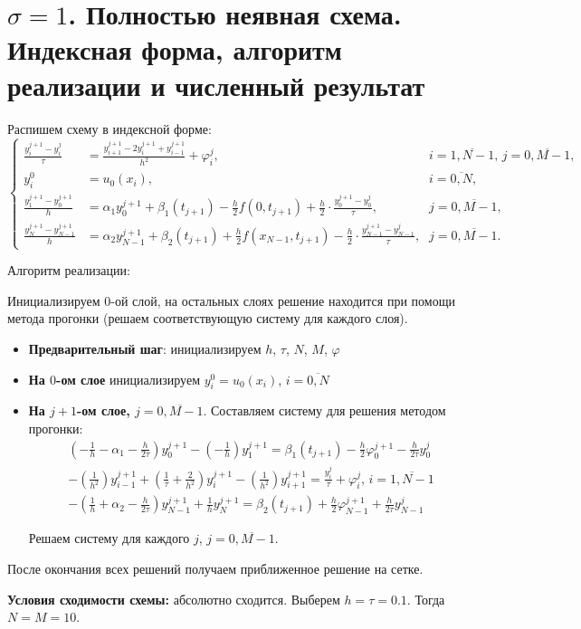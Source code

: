 \section{$\sigma=1$. Полностью неявная схема. Индексная форма, алгоритм реализации и численный результат}
Распишем схему в индексной форме:
\begin{equation}
\left\{
\begin{array}{lll}
\frac{y_{i}^{j+1}-y_{i}^{j}}{\tau} & =\frac{y_{i+1}^{j+1}-2y_{i}^{j+1}+y_{i-1}^{j+1}}{h^{2}} + \varphi_{i}^{j}\text{,} & i=\overline{1,N-1}\text{, } j=\overline{0,M-1}\text{,}\\
y_{i}^{0} & = u_{0}(x_{i})\text{,} & i=\overline{0,N}\text{,} \\
\frac{y_{1}^{j+1}-y_{0}^{j+1}}{h} & = \alpha_{1}y_{0}^{j+1} + \beta_{1}(t_{j+1}) - \frac{h}{2}f(0,t_{j+1}) + \frac{h}{2}\cdot\frac{y_{0}^{j+1}-y_{0}^{j}}{\tau}\text{,} & j=\overline{0,M-1}\text{,}\\
\frac{y_{N}^{j+1}-y_{N-1}^{j+1}}{h} & = \alpha_{2}y_{N-1}^{j+1} + \beta_{2}(t_{j+1}) + \frac{h}{2}f(x_{N-1},t_{j+1}) - \frac{h}{2}\cdot\frac{y_{N-1}^{j+1}-y_{N-1}^{j}}{\tau}\text{,} & j=\overline{0,M-1}\text{.}
\end{array}
\right.
\end{equation} \par

Алгоритм реализации:\par
Инициализируем $0$-ой слой, на остальных слоях решение находится при помощи метода прогонки (решаем соответствующую систему для каждого слоя).
\begin{itemize}
\item \textbf{Предварительный шаг}: инициализируем $h$, $\tau$, $N$, $M$, $\varphi$
\item \textbf{На $0$-ом слое} инициализируем $y_{i}^{0} = u_{0}(x_{i})$, $i=\overline{0,N}$
\item { \textbf{На $j+1$-ом слое, $j=\overline{0,M-1}$}. Составляем систему для решения методом прогонки:
\begin{eqnarray*}
& (-\frac{1}{h}-\alpha_{1}-\frac{h}{2\tau})y_{0}^{j+1} - (-\frac{1}{h})y_{1}^{j+1} = \beta_{1}(t_{j+1}) -\frac{h}{2}\varphi_{0}^{j+1} -\frac{h}{2\tau}y_{0}^{j} \\
& -(\frac{1}{h^{2}})y_{i-1}^{j+1} + (\frac{1}{\tau} + \frac{2}{h^{2}})y_{i}^{j+1} -(\frac{1}{h^{2}})y_{i+1}^{j+1} = \frac{y_{i}^{j}}{\tau} + \varphi_{i}^{j}\text{, }i=\overline{1,N-1} \\
& -(\frac{1}{h}+\alpha_{2}-\frac{h}{2\tau})y_{N-1}^{j+1} + \frac{1}{h}y_{N}^{j+1} = \beta_{2}(t_{j+1}) + \frac{h}{2}\varphi_{N-1}^{j+1} + \frac{h}{2\tau}y_{N-1}^{j}
\end{eqnarray*}\par
Решаем систему для каждого $j$, $j=\overline{0,M-1}$.
}
\end{itemize} \par
После окончания всех решений получаем приближенное решение на сетке. \par
\textbf{Условия сходимости схемы:} абсолютно сходится. Выберем $h=\tau=0.1$. Тогда $N=M=10$. \par

